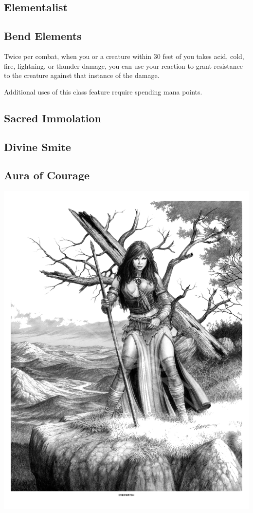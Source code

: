 
\begin{multicols*}{2}

\section{Elementalist}

\subsection*{Bend Elements}

Twice per combat, when you or a creature within 30 feet of you takes acid, cold, fire, lightning, or thunder damage, you can use your reaction to grant resistance to the creature against that instance of the damage.

Additional uses of this class feature require spending mana points.

\subsection*{Sacred Immolation}

\subsection*{Divine Smite}

\subsection*{Aura of Courage}

\begin{Figure}
\centering
\includegraphics[width=\textwidth]{img/druid-2.png}
\end{Figure}
    
\end{multicols*}

    